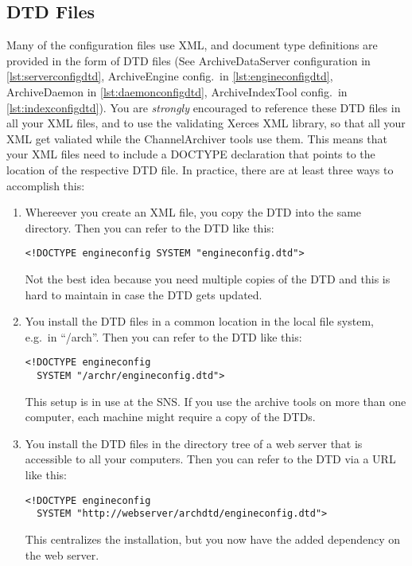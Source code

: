 \subsection{DTD Files} \label{sec:dtdfiles}
Many of the configuration files use XML, and document type
definitions are provided in the form of DTD files
(See ArchiveDataServer configuration in \ref{lst:serverconfigdtd},
 ArchiveEngine config.\ in \ref{lst:engineconfigdtd}, ArchiveDaemon in
 \ref{lst:daemonconfigdtd}, ArchiveIndexTool config.\ in
 \ref{lst:indexconfigdtd}).
You are \emph{strongly} encouraged to reference these DTD files in all
your XML files, and to use the validating Xerces XML library, so that
all your XML get valiated while the ChannelArchiver tools use them.
This means that your XML files need to include a DOCTYPE declaration
that points to the location of the respective DTD file.
In practice, there are at least three ways to accomplish this:
\begin{enumerate}
\item Whereever you create an XML file, you copy the DTD into the same
  directory. Then you can refer to the DTD like this: 
  \begin{lstlisting}[keywordstyle=\sffamily]
  <!DOCTYPE engineconfig SYSTEM "engineconfig.dtd">
  \end{lstlisting}
  \noindent Not the best idea because you need multiple copies of the
  DTD and this is hard to maintain in case the DTD gets updated.
\item You install the DTD files in a common location in the local file
  system, e.g.\ in ``/arch''. Then you can refer to the DTD like this: 
  \begin{lstlisting}[keywordstyle=\sffamily]
  <!DOCTYPE engineconfig
  SYSTEM "/archr/engineconfig.dtd">
  \end{lstlisting}
  \noindent This setup is in use at the SNS. If you use the archive tools
  on more than one computer, each machine might require a copy of the DTDs.
\item You install the DTD files in the directory tree of a web server
  that is accessible to all your computers.
  Then you can refer to the DTD via a URL like this: 
  \begin{lstlisting}[keywordstyle=\sffamily]
  <!DOCTYPE engineconfig
  SYSTEM "http://webserver/archdtd/engineconfig.dtd">
  \end{lstlisting}
  This centralizes the installation, but you now have the added dependency on
  the web server.
\end{enumerate}
